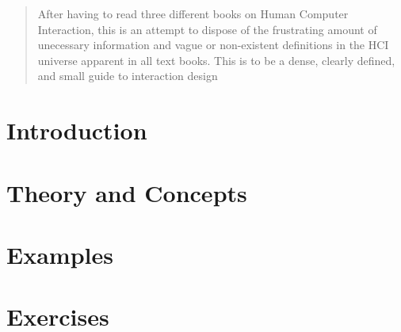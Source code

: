 \documentclass[a4, english, twoside]{article}
\begin{document}
\maketitle

\begin{abstract}
  \noindent After having to read three different books on Human Computer Interaction, this is an attempt to dispose of the frustrating amount of unecessary information and vague or non-existent definitions in the HCI universe apparent in all text books. This is to be a dense, clearly defined, and small guide to interaction design
\end{abstract}

\newpage
\tableofcontents

\newpage
\section{Introduction}
\label{sec:introduction}



\newpage
\section{Theory and Concepts}
\label{sec:1}








\newpage
\section{Examples}
\label{sec:2}



\newpage
\section{Exercises}
\label{sec:3}
\end{document}
